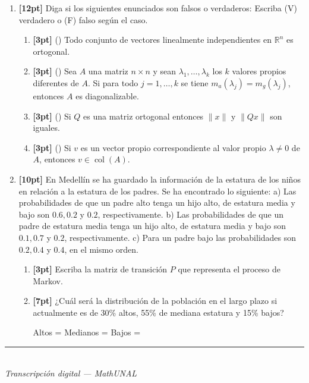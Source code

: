 \documentclass[11pt]{article}
\newcommand{\examfooter}{%
  \vfill
  \rule{\linewidth}{0.4pt}\\[1pt]
  {\scriptsize\textit{Transcripci\'on digital --- MathUNAL}\hfill\textcolor{unalblue}{\textbf{\thepage}}}
}
\begin{document}
\begin{enumerate}
\item \textbf{[12pt]} Diga si los siguientes enunciados son falsos o verdaderos: Escriba (V) verdadero o (F) falso seg\'un el caso.
\begin{enumerate}[label=(\alph*)]
\item \textbf{[3pt]} (\dotfill) Todo conjunto de vectores linealmente independientes en $\mathbb{R}^n$ es ortogonal.
\item \textbf{[3pt]} (\dotfill) Sea $A$ una matriz $n\times n$ y sean $\lambda_1,\dots,\lambda_k$ los $k$ valores propios diferentes de $A$. Si para todo $j=1,\dots,k$ se tiene $m_a(\lambda_j)=m_g(\lambda_j)$, entonces $A$ es diagonalizable.
\item \textbf{[3pt]} (\dotfill) Si $Q$ es una matriz ortogonal entonces $\|x\|$ y $\|Qx\|$ son iguales.
\item \textbf{[3pt]} (\dotfill) Si $v$ es un vector propio correspondiente al valor propio $\lambda\neq 0$ de $A$, entonces $v\in \operatorname{col}(A)$.
\end{enumerate}

\item \textbf{[10pt]} En Medell\'in se ha guardado la informaci\'on de la estatura de los ni\~nos en relaci\'on a la estatura de los padres. Se ha encontrado lo siguiente: a) Las probabilidades de que un padre alto tenga un hijo alto, de estatura media y bajo son $0.6, 0.2$ y $0.2$, respectivamente. b) Las probabilidades de que un padre de estatura media tenga un hijo alto, de estatura media y bajo son $0.1, 0.7$ y $0.2$, respectivamente. c) Para un padre bajo las probabilidades son $0.2, 0.4$ y $0.4$, en el mismo orden.
\begin{enumerate}[label=(\alph*)]
\item \textbf{[3pt]} Escriba la matriz de transici\'on $P$ que representa el proceso de Markov.

\vspace{20pt}
\item \textbf{[7pt]} ¿Cu\'al ser\'a la distribuci\'on de la poblaci\'on en el largo plazo si actualmente es de 30\% altos, 55\% de mediana estatura y 15\% bajos?

\vspace{10pt}
Altos = \dotfill \quad Medianos = \dotfill \quad Bajos = \dotfill
\end{enumerate}
\end{enumerate}

\examfooter
\newpage
\end{document}
